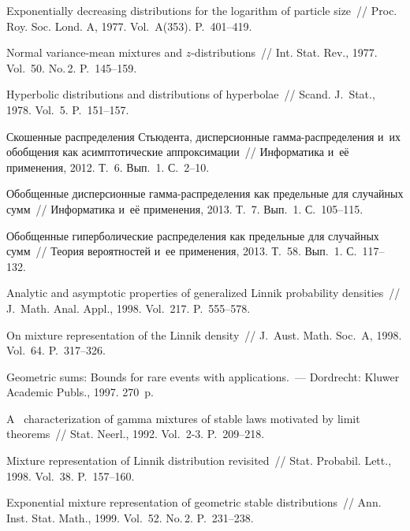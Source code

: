 \begin{multicols}{2}
{{\begin{thebibliography}{99}
 Exponentially decreasing distributions for the 
logarithm of particle size~// Proc. Roy. Soc. Lond. A, 1977. Vol.~A(353). P.~401--419.


Normal variance-mean mixtures and $z$-distributions~// 
Int. Stat. Rev., 1977. Vol.~50. No.\,2. P.~145--159.

 Hyperbolic distributions and distributions of hyperbolae~// 
Scand. J.~Stat., 1978. Vol.~5. P.~151--157.


 Скошенные распределения Стьюдента,
 дисперсионные гам\-ма-рас\-пре\-де\-ле\-ния и~их обобщения как асимптотические 
 аппроксимации~// Информатика и~её применения, 2012. Т.~6. Вып.~1. С.~2--10.

 Обобщенные дисперсионные гамма-распределения 
как предельные для случайных сумм~// Информатика и~её применения, 2013. Т.~7. Вып.~1. С.~105--115.

 Обобщенные гиперболические распределения как предельные 
для случайных сумм~// Теория вероятностей и~ее применения, 2013. Т.~58. Вып.~1. С.~117--132.

Analytic and asymptotic properties of generalized Linnik probability densities~//
J.~Math. Anal. Appl., 1998. Vol.~217. P.~555--578.

 On mixture representation
 of the Linnik density~// J.~Aust. Math. Soc.~A, 1998. Vol.~64. P.~317--326.
 
 \pagebreak

 Geometric sums: Bounds for rare events with applications.~--- 
Dordrecht: Kluwer Academic Publs., 1997. 270~p.

 A~ characterization of gamma mixtures of stable laws motivated by 
limit theorems~// Stat. Neerl., 1992. Vol.~2-3. P.~209--218.

 Mixture representation of Linnik distribution revisited~// 
Stat. Probabil. Lett., 1998. Vol.~38. P.~157--160.

 Exponential mixture representation 
of geometric stable distributions~// 
Ann. Inst. Stat. Math., 1999. Vol.~52. No.\,2. P.~231--238.
 \end{thebibliography}

 }
 }

\end{multicols}

